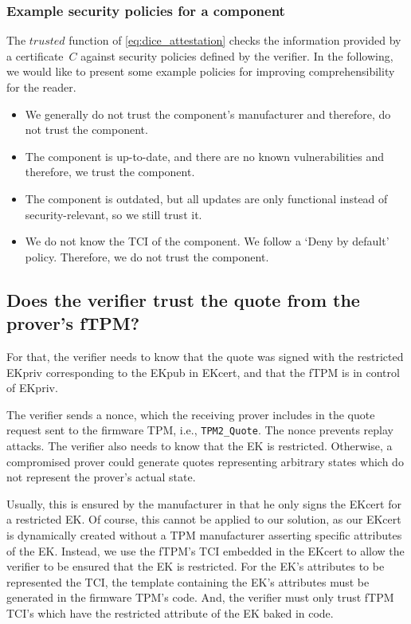 \subsubsection{Example security policies for a component}

The \(trusted\) function of \autoref{eq:dice_attestation} checks the information provided by a certificate~\(C\) against security policies defined by the verifier.
In the following, we would like to present some example policies for improving comprehensibility for the reader.

\begin{itemize}
    \item We generally do not trust the component's manufacturer and therefore, do not trust the component.
    \item The component is up-to-date, and there are no known vulnerabilities and therefore, we trust the component.
    \item The component is outdated, but all updates are only functional instead of security-relevant, so we still trust it.
    \item We do not know the TCI of the component. We follow a `Deny by default' policy. Therefore, we do not trust the component.
\end{itemize}

\subsection{Does the verifier trust the quote from the prover's fTPM?}

For that, the verifier needs to know that the quote was signed with the restricted EKpriv corresponding to the EKpub in EKcert, and that the fTPM is in control of EKpriv.

The verifier sends a nonce, which the receiving prover includes in the quote request sent to the firmware TPM, i.e., \texttt{TPM2\_Quote}.
The nonce prevents replay attacks.
The verifier also needs to know that the EK is restricted.
Otherwise, a compromised prover could generate quotes representing arbitrary states which do not represent the prover's actual state.

Usually, this is ensured by the manufacturer in that he only signs the EKcert for a restricted EK\@.
Of course, this cannot be applied to our solution, as our EKcert is dynamically created without a TPM manufacturer asserting specific attributes of the EK\@.
Instead, we use the fTPM's TCI embedded in the EKcert to allow the verifier to be ensured that the EK is restricted.
For the EK's attributes to be represented the TCI, the template containing the EK's attributes must be generated in the firmware TPM's code.
And, the verifier must only trust fTPM TCI's which have the restricted attribute of the EK baked in code.

